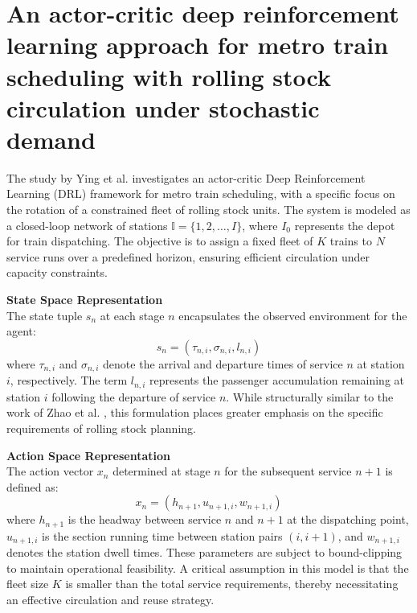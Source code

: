 \documentclass[a4paper]{scrartcl}
\begin{document}
\section{An actor-critic deep reinforcement learning approach for metro train scheduling with rolling stock circulation under stochastic demand}
The study by Ying et al. \cite{YING2020210} investigates an actor-critic Deep Reinforcement Learning (DRL) framework for metro train scheduling, with a specific focus on the rotation of a constrained fleet of rolling stock units. The system is modeled as a closed-loop network of stations $\mathbb{I} = \{1, 2, \dots, I\}$, where $I_0$ represents the depot for train dispatching. The objective is to assign a fixed fleet of $K$ trains to $N$ service runs over a predefined horizon, ensuring efficient circulation under capacity constraints.

\textbf{State Space Representation} \\
The state tuple $s_n$ at each stage $n$ encapsulates the observed environment for the agent:
\begin{equation}
s_n = (\tau_{n,i}, \sigma_{n,i}, l_{n,i})
\end{equation}
where $\tau_{n,i}$ and $\sigma_{n,i}$ denote the arrival and departure times of service $n$ at station $i$, respectively. The term $l_{n,i}$ represents the passenger accumulation remaining at station $i$ following the departure of service $n$. While structurally similar to the work of Zhao et al. \cite{ZHAO2026111784}, this formulation places greater emphasis on the specific requirements of rolling stock planning.

\textbf{Action Space Representation} \\
The action vector $x_n$ determined at stage $n$ for the subsequent service $n+1$ is defined as:
\begin{equation}
x_n = (h_{n+1}, u_{n+1,i}, w_{n+1,i})
\end{equation}
where $h_{n+1}$ is the headway between service $n$ and $n+1$ at the dispatching point, $u_{n+1,i}$ is the section running time between station pairs $(i, i+1)$, and $w_{n+1,i}$ denotes the station dwell times. These parameters are subject to bound-clipping to maintain operational feasibility. A critical assumption in this model is that the fleet size $K$ is smaller than the total service requirements, thereby necessitating an effective circulation and reuse strategy.
\end{document}
